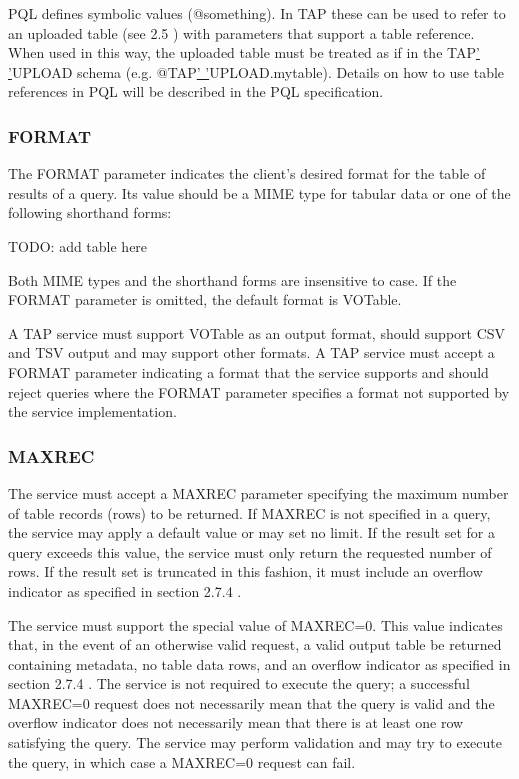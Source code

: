 \documentclass[11pt,a4paper]{ivoa}
\begin{document}
PQL defines symbolic values (@something). In TAP these can be used to refer to  
an uploaded table (see 2.5 ) with parameters that support a table reference. 
When used in this way, the uploaded table must be treated as if in the 
TAP\underline{' '}UPLOAD schema (e.g. @TAP\underline{' '}UPLOAD.mytable). 
Details on how to use table references in PQL will be described in the PQL 
specification.

\subsubsection{FORMAT}
The FORMAT parameter indicates the client's desired format for the table of 
results of a query. Its value should be a MIME type for tabular data or one of 
the following shorthand forms:

TODO: add table here

Both MIME types and the shorthand forms are insensitive to case. If the FORMAT 
parameter is omitted, the default format is VOTable.

A TAP service must support VOTable as an output format, should support CSV and 
TSV output and may support other formats. A TAP service must accept a FORMAT 
parameter indicating a format that the service supports and should reject 
queries where the FORMAT parameter specifies a format not supported by the 
service implementation.

\subsubsection{MAXREC}
The service must accept a MAXREC parameter specifying the maximum number of 
table records (rows) to be returned. If MAXREC is not specified in a query, the 
service may apply a default value or may set no limit. If the result set for a 
query exceeds this value, the service must only return the requested number of 
rows. If the result set is truncated in this fashion, it must include an 
overflow indicator as specified in section 2.7.4 .

The service must support the special value of MAXREC=0. This value indicates 
that, in the event of an otherwise valid request, a valid output table be 
returned containing metadata, no table data rows, and an overflow indicator as 
specified in section 2.7.4 .  The service is not required to execute the query; 
a successful  MAXREC=0 request does not necessarily mean that the query is valid 
and the overflow indicator does not necessarily mean that there is at least one 
row satisfying the query. The service may perform validation and may try to 
execute the query, in which case a MAXREC=0 request can fail.
\end{document}
